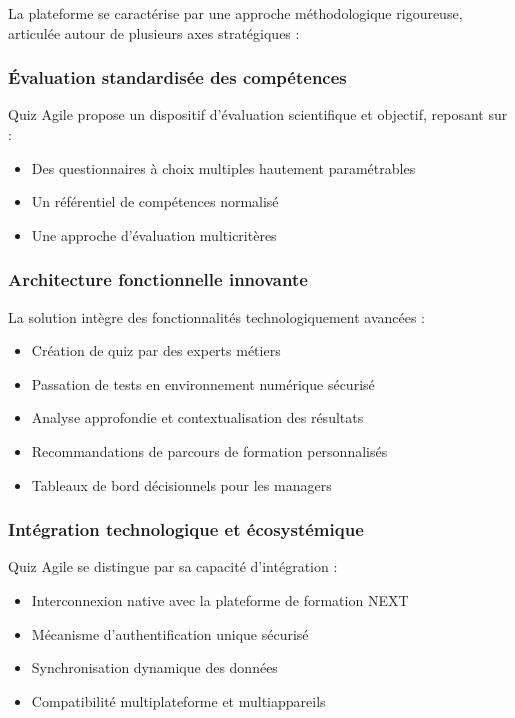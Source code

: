 \documentclass[12pt,a4paper]{report}
\begin{document}
La plateforme se caractérise par une approche méthodologique rigoureuse, articulée autour de plusieurs axes stratégiques :

\subsubsection{Évaluation standardisée des compétences}

Quiz Agile propose un dispositif d'évaluation scientifique et objectif, reposant sur :
\begin{itemize}
\item Des questionnaires à choix multiples hautement paramétrables
\item Un référentiel de compétences normalisé
\item Une approche d'évaluation multicritères
\end{itemize}

\subsubsection{Architecture fonctionnelle innovante}

La solution intègre des fonctionnalités technologiquement avancées :
\begin{itemize}
\item Création de quiz par des experts métiers
\item Passation de tests en environnement numérique sécurisé
\item Analyse approfondie et contextualisation des résultats
\item Recommandations de parcours de formation personnalisés
\item Tableaux de bord décisionnels pour les managers
\end{itemize}

\subsubsection{Intégration technologique et écosystémique}

Quiz Agile se distingue par sa capacité d'intégration :
\begin{itemize}
\item Interconnexion native avec la plateforme de formation NEXT
\item Mécanisme d'authentification unique sécurisé
\item Synchronisation dynamique des données
\item Compatibilité multiplateforme et multiappareils
\end{itemize}
\end{document}
